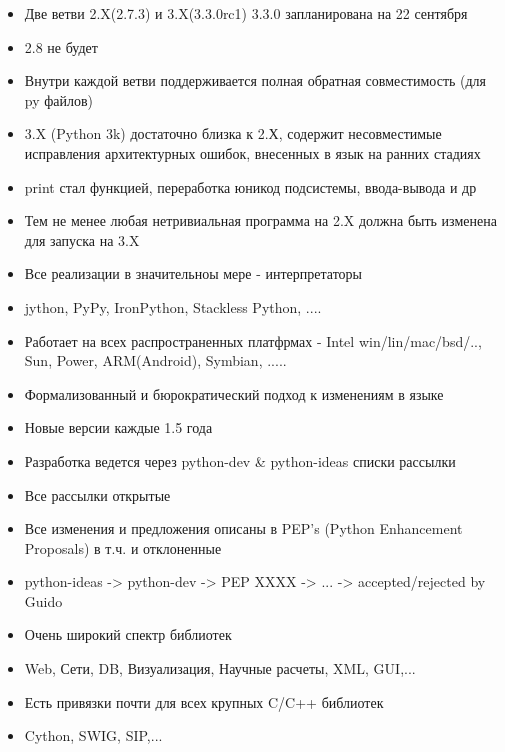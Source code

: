 \documentclass{article}
\begin{document}
\begin{itemize}
    \item Две ветви 2.X(2.7.3) и 3.X(3.3.0rc1) 3.3.0 запланирована на 22 сентября
    \item 2.8 не будет
    \item Внутри каждой ветви поддерживается полная обратная совместимость (для py файлов)
    \item 3.X (Python 3k) достаточно близка к 2.Х, содержит несовместимые исправления 
    		архитектурных ошибок, внесенных в язык на ранних стадиях
    \item print стал функцией, переработка юникод подсистемы, ввода-вывода и др
    \item Тем не менее любая нетривиальная программа на 2.X должна быть изменена для запуска на 3.X
    \item Все реализации в значительноы мере - интерпретаторы
    \item jython, PyPy, IronPython, Stackless Python, ....
    \item Работает на всех распространенных платфрмах - Intel win/lin/mac/bsd/.., Sun, Power, 
    		ARM(Android), Symbian, .....
\end{itemize}
\newpage

\begin{itemize}
    \item Формализованный и бюрократический подход к изменениям в языке
    \item Новые версии каждые 1.5 года
    \item Разработка ведется через python-dev \& python-ideas списки рассылки
    \item Все рассылки открытые
    \item Все изменения и предложения описаны в PEP's (Python Enhancement Proposals) 
            в т.ч. и отклоненные
    \item python-ideas -> python-dev -> PEP XXXX -> ... -> {accepted/rejected} by Guido
\end{itemize}
\newpage

\begin{itemize}
    \item Очень широкий спектр библиотек
    \item Web, Сети, DB, Визуализация, Научные расчеты, XML, GUI,...
    \item Есть привязки почти для всех крупных C/C++ библиотек
    \item Cython, SWIG, SIP,...
\end{itemize}
\newpage
\end{document}
